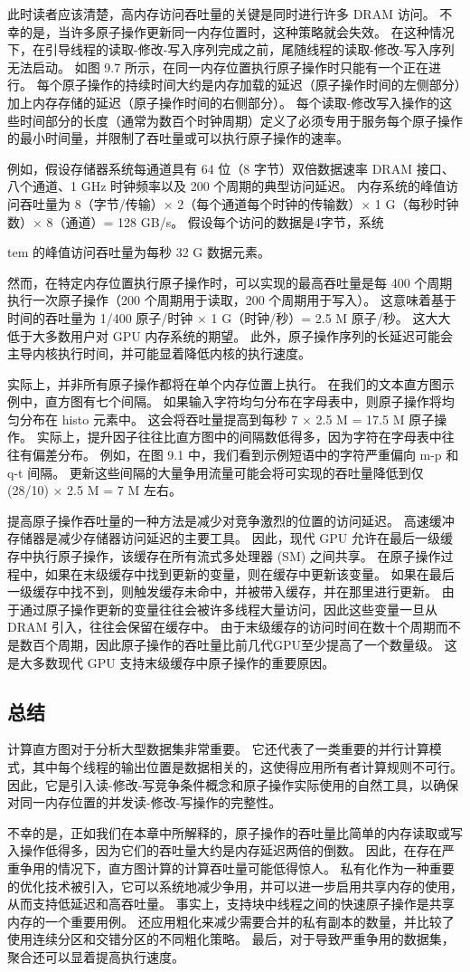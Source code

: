 此时读者应该清楚，高内存访问吞吐量的关键是同时进行许多 DRAM 访问。 不幸的是，当许多原子操作更新同一内存位置时，这种策略就会失效。 在这种情况下，在引导线程的读取-修改-写入序列完成之前，尾随线程的读取-修改-写入序列无法启动。 如图 9.7 所示，在同一内存位置执行原子操作时只能有一个正在进行。 每个原子操作的持续时间大约是内存加载的延迟（原子操作时间的左侧部分）加上内存存储的延迟（原子操作时间的右侧部分）。 每个读取-修改写入操作的这些时间部分的长度（通常为数百个时钟周期）定义了必须专用于服务每个原子操作的最小时间量，并限制了吞吐量或可以执行原子操作的速率。

例如，假设存储器系统每通道具有 64 位（8 字节）双倍数据速率 DRAM 接口、八个通道、1 GHz 时钟频率以及 200 个周期的典型访问延迟。 内存系统的峰值访问吞吐量为 8（字节/传输）× 2（每个通道每个时钟的传输数）× 1 G（每秒时钟数）× 8（通道）= 128 GB/s。 假设每个访问的数据是4字节，系统

tem 的峰值访问吞吐量为每秒 32 G 数据元素。

然而，在特定内存位置执行原子操作时，可以实现的最高吞吐量是每 400 个周期执行一次原子操作（200 个周期用于读取，200 个周期用于写入）。 这意味着基于时间的吞吐量为 1/400 原子/时钟 × 1 G（时钟/秒）= 2.5 M 原子/秒。 这大大低于大多数用户对 GPU 内存系统的期望。 此外，原子操作序列的长延迟可能会主导内核执行时间，并可能显着降低内核的执行速度。

实际上，并非所有原子操作都将在单个内存位置上执行。 在我们的文本直方图示例中，直方图有七个间隔。 如果输入字符均匀分布在字母表中，则原子操作将均匀分布在 histo 元素中。 这会将吞吐量提高到每秒 7 × 2.5 M = 17.5 M 原子操作。 实际上，提升因子往往比直方图中的间隔数低得多，因为字符在字母表中往往有偏差分布。 例如，在图 9.1 中，我们看到示例短语中的字符严重偏向 m-p 和 q-t 间隔。 更新这些间隔的大量争用流量可能会将可实现的吞吐量降低到仅 (28/10) × 2.5 M = 7 M 左右。

提高原子操作吞吐量的一种方法是减少对竞争激烈的位置的访问延迟。 高速缓冲存储器是减少存储器访问延迟的主要工具。 因此，现代 GPU 允许在最后一级缓存中执行原子操作，该缓存在所有流式多处理器 (SM) 之间共享。 在原子操作过程中，如果在末级缓存中找到更新的变量，则在缓存中更新该变量。 如果在最后一级缓存中找不到，则触发缓存未命中，并被带入缓存，并在那里进行更新。 由于通过原子操作更新的变量往往会被许多线程大量访问，因此这些变量一旦从 DRAM 引入，往往会保留在缓存中。 由于末级缓存的访问时间在数十个周期而不是数百个周期，因此原子操作的吞吐量比前几代GPU至少提高了一个数量级。 这是大多数现代 GPU 支持末级缓存中原子操作的重要原因。

\subsection{总结}
计算直方图对于分析大型数据集非常重要。 它还代表了一类重要的并行计算模式，其中每个线程的输出位置是数据相关的，这使得应用所有者计算规则不可行。 因此，它是引入读-修改-写竞争条件概念和原子操作实际使用的自然工具，以确保对同一内存位置的并发读-修改-写操作的完整性。

不幸的是，正如我们在本章中所解释的，原子操作的吞吐量比简单的内存读取或写入操作低得多，因为它们的吞吐量大约是内存延迟两倍的倒数。 因此，在存在严重争用的情况下，直方图计算的计算吞吐量可能低得惊人。 私有化作为一种重要的优化技术被引入，它可以系统地减少争用，并可以进一步启用共享内存的使用，从而支持低延迟和高吞吐量。 事实上，支持块中线程之间的快速原子操作是共享内存的一个重要用例。 还应用粗化来减少需要合并的私有副本的数量，并比较了使用连续分区和交错分区的不同粗化策略。 最后，对于导致严重争用的数据集，聚合还可以显着提高执行速度。
